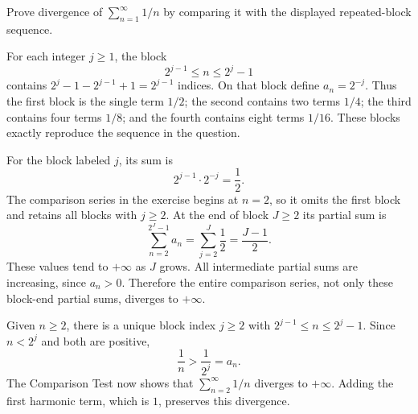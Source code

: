 \goal Prove divergence of $\sum_{n=1}^{\infty}1/n$ by comparing
it with the displayed repeated-block sequence.

For each integer $j\ge1$, the block
\[
 2^{j-1}\le n\le2^j-1
\]
contains $2^j-1-2^{j-1}+1=2^{j-1}$ indices. On that block
define $a_n=2^{-j}$. Thus the first block is the single term
$1/2$; the second contains two terms $1/4$; the third contains
four terms $1/8$; and the fourth contains eight terms $1/16$.
These blocks exactly reproduce the sequence in the question.

For the block labeled $j$, its sum is
\[
 2^{j-1}\cdot2^{-j}=\frac12.
\]
The comparison series in the exercise begins at $n=2$, so it
omits the first block and retains all blocks with $j\ge2$.
At the end of block $J\ge2$ its partial sum is
\[
 \sum_{n=2}^{2^J-1}a_n
 =\sum_{j=2}^{J}\frac12=\frac{J-1}{2}.
\]
These values tend to $+\infty$ as $J$ grows. All intermediate
partial sums are increasing, since $a_n>0$. Therefore the entire
comparison series, not only these block-end partial sums,
diverges to $+\infty$.

Given $n\ge2$, there is a unique block index $j\ge2$ with
$2^{j-1}\le n\le2^j-1$. Since $n<2^j$ and both are positive,
\[
 \frac1n>\frac1{2^j}=a_n.
\]
The Comparison Test now shows that $\sum_{n=2}^{\infty}1/n$
diverges to $+\infty$. Adding the first harmonic term, which is
$1$, preserves this divergence.
